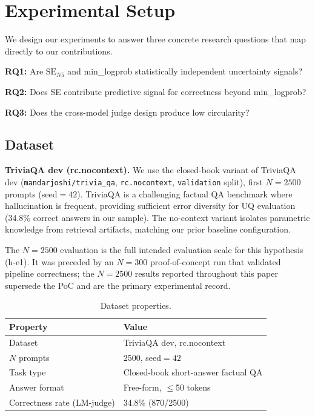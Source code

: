 \section{Experimental Setup}
\label{sec:setup}

We design our experiments to answer three concrete research questions that map directly to our contributions.

\textbf{RQ1:} Are $\text{SE}_{N5}$ and min\_logprob statistically independent uncertainty signals?

\textbf{RQ2:} Does SE contribute predictive signal for correctness beyond min\_logprob?

\textbf{RQ3:} Does the cross-model judge design produce low circularity?

\subsection{Dataset}

\textbf{TriviaQA dev (rc.nocontext).} We use the closed-book variant of TriviaQA dev (\texttt{mandarjoshi/trivia\_qa}, \texttt{rc.nocontext}, \texttt{validation} split), first $N=2500$ prompts (seed$=42$). TriviaQA is a challenging factual QA benchmark where hallucination is frequent, providing sufficient error diversity for UQ evaluation (34.8\% correct answers in our sample). The no-context variant isolates parametric knowledge from retrieval artifacts, matching our prior baseline configuration.

The $N=2500$ evaluation is the full intended evaluation scale for this hypothesis (h-e1). It was preceded by an $N=300$ proof-of-concept run that validated pipeline correctness; the $N=2500$ results reported throughout this paper supersede the PoC and are the primary experimental record.

\begin{table}[h]
\centering
\caption{Dataset properties.}
\label{tab:dataset}
\begin{tabular}{ll}
\toprule
\textbf{Property} & \textbf{Value} \\
\midrule
Dataset & TriviaQA dev, rc.nocontext \\
$N$ prompts & 2500, seed$=42$ \\
Task type & Closed-book short-answer factual QA \\
Answer format & Free-form, $\leq$50 tokens \\
Correctness rate (LM-judge) & 34.8\% (870/2500) \\
\bottomrule
\end{tabular}
\end{table}

